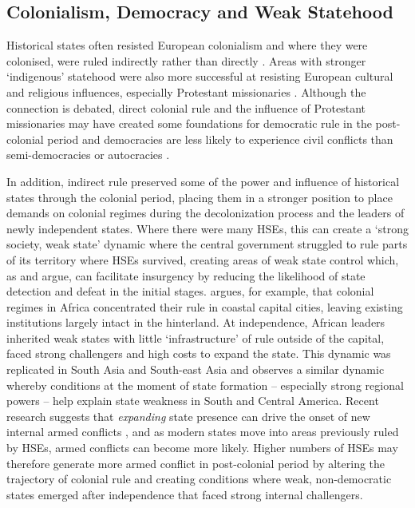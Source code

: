 
\subsection{Colonialism, Democracy and Weak Statehood}

Historical states often resisted European colonialism and where they were
colonised, were ruled indirectly rather than directly \citep{Gerring2011,
Hariri2012, Englebert2000}. Areas with stronger `indigenous' statehood were also
more successful at resisting European cultural and religious influences,
especially Protestant missionaries \citep{Woodberry2012}. Although the
connection is debated, direct colonial rule and the influence of Protestant
missionaries may have created some foundations for democratic rule in the
post-colonial period \citep{Woodberry2012, Hariri2012} and democracies are less
likely to experience civil conflicts than semi-democracies or autocracies
\citep{Hegre2006}.

In addition, indirect rule preserved some of the power and influence of
historical states through the colonial period, placing them in a stronger
position to place demands on colonial regimes during the decolonization process
and the leaders of newly independent states. Where there were many HSEs, this
can create a `strong society, weak state' dynamic where the central government
struggled to rule parts of its territory where HSEs survived, creating areas of
weak state control which, as \citet{Fearon2003} and \citet{Lewis2017} argue, can
facilitate insurgency by reducing the likelihood of state detection and defeat
in the initial stages. \citet{Herbst2014} argues, for example, that colonial
regimes in Africa concentrated their rule in coastal capital cities, leaving
existing institutions largely intact in the hinterland. At independence, African
leaders inherited weak states with little `infrastructure' of rule outside of
the capital, faced strong challengers and high costs to expand the state. This
dynamic was replicated in South Asia and South-east Asia \citep{Migdal1988} and
\citet{Mazzuca2021} observes a similar dynamic whereby conditions at the moment
of state formation -- especially strong regional powers -- help explain state
weakness in South and Central America. Recent research suggests that
\textit{expanding} state presence can drive the onset of new internal armed
conflicts \citep{Ying2020}, and as modern states move into areas previously
ruled by HSEs, armed conflicts can become more likely. Higher numbers of HSEs
may therefore generate more armed conflict in post-colonial period by altering
the trajectory of colonial rule and creating conditions where weak,
non-democratic states emerged after independence that faced strong internal
challengers. 


